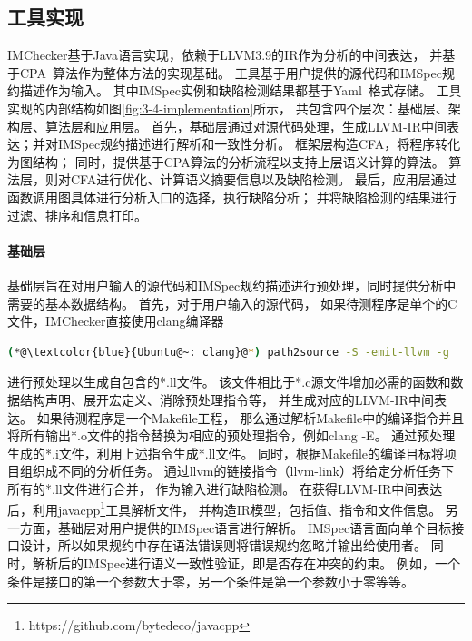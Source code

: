 \subsection{工具实现}
IMChecker基于Java语言实现，依赖于LLVM3.9的IR作为分析的中间表达，
并基于CPA~\cite{07-cav-cpachecker}算法作为整体方法的实现基础。
工具基于用户提供的源代码和IMSpec规约描述作为输入。
其中IMSpec实例和缺陷检测结果都基于Yaml~\cite{yaml}格式存储。
工具实现的内部结构如图\ref{fig:3-4-implementation}所示，
共包含四个层次：基础层、架构层、算法层和应用层。
首先，基础层通过对源代码处理，生成LLVM-IR中间表达；并对IMSpec规约描述进行解析和一致性分析。
框架层构造CFA，将程序转化为图结构；
同时，提供基于CPA算法的分析流程以支持上层语义计算的算法。
算法层，则对CFA进行优化、计算语义摘要信息以及缺陷检测。
最后，应用层通过函数调用图具体进行分析入口的选择，执行缺陷分析；
并将缺陷检测的结果进行过滤、排序和信息打印。

\paragraph{基础层}
基础层旨在对用户输入的源代码和IMSpec规约描述进行预处理，同时提供分析中需要的基本数据结构。
首先，对于用户输入的源代码，
如果待测程序是单个的C文件，IMChecker直接使用clang编译器
\begin{lstlisting}[language={bash},
basicstyle=\linespread{0.8}\listingsfont,
numbers=none,
xleftmargin=.25\textwidth]
(*@\textcolor{blue}{Ubuntu@~: clang}@*) path2source -S -emit-llvm -g
\end{lstlisting}
进行预处理以生成自包含的*.ll文件。
该文件相比于*.c源文件增加必需的函数和数据结构声明、展开宏定义、消除预处理指令等，
并生成对应的LLVM-IR中间表达。
如果待测程序是一个Makefile工程，
那么通过解析Makefile中的编译指令并且将所有输出*.o文件的指令替换为相应的预处理指令，例如clang -E。
通过预处理生成的*.i文件，利用上述指令生成*.ll文件。
同时，根据Makefile的编译目标将项目组织成不同的分析任务。
通过llvm的链接指令（llvm-link）将给定分析任务下所有的*.ll文件进行合并，
作为输入进行缺陷检测。
在获得LLVM-IR中间表达后，利用javacpp\footnote{https://github.com/bytedeco/javacpp}工具解析文件，
并构造IR模型，包括值、指令和文件信息。
另一方面，基础层对用户提供的IMSpec语言进行解析。
IMSpec语言面向单个目标接口设计，所以如果规约中存在语法错误则将错误规约忽略并输出给使用者。
同时，解析后的IMSpec进行语义一致性验证，即是否存在冲突的约束。
例如，一个条件是接口的第一个参数大于零，另一个条件是第一个参数小于零等等。

